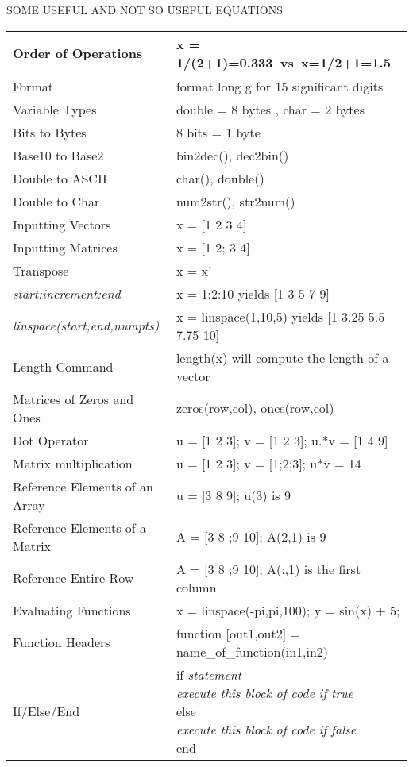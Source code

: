 \documentclass[11pt,a4paper,twoside,openright]{book}
\begin{document}
\begin{center}{\LARGE SOME USEFUL AND NOT SO USEFUL EQUATIONS}\end{center}

\begin{tabular}{|l | l|}
  \hline
  Order of Operations & x = 1/(2+1)=0.333~vs~x=1/2+1=1.5 \\
  \hline
  Format & format long g for 15 significant digits \\
  \hline
  Variable Types & double = 8 bytes , char = 2 bytes \\
  \hline
  Bits to Bytes & 8 bits = 1 byte \\
  \hline
  Base10 to Base2  & bin2dec(), dec2bin() \\
  \hline
  Double to ASCII  & char(), double() \\
  \hline
  Double to Char  & num2str(), str2num() \\
  \hline
  Inputting Vectors & x = [1 2 3 4] \\
  \hline
  Inputting Matrices & x = [1 2; 3 4] \\
  \hline
  Transpose & x = x' \\
  \hline
  {\it start:increment:end} & x = 1:2:10 yields
  [1 3 5 7 9] \\
  \hline
  {\it linspace(start,end,numpts)} & x =
  linspace(1,10,5) yields [1 3.25 5.5 7.75 10] \\
  \hline
  Length Command & length(x) will compute the length of a vector \\
  \hline
  Matrices of Zeros and Ones & zeros(row,col), ones(row,col)
  \\
  \hline
  Dot Operator & u = [1 2 3]; v = [1 2 3]; u.*v = [1 4 9] \\
  \hline
  Matrix multiplication & u = [1 2 3]; v = [1;2;3]; u*v = 14 \\
  \hline
  Reference Elements of an Array & u = [3 8 9]; u(3) is 9 \\
  \hline
  Reference Elements of a Matrix & A = [3 8 ;9 10]; A(2,1) is 9 \\
  \hline
  Reference Entire Row & A = [3 8 ;9 10]; A(:,1) is the first column
  \\
  \hline
  Evaluating Functions & x = linspace(-pi,pi,100); y = sin(x) + 5; \\
  \hline
  Function Headers & function [out1,out2] =
  name\_of\_function(in1,in2) \\
  \hline
  If/Else/End & \pbox{12cm}{if {\it statement} \\{\it execute this block of code if true}  \\  else \\ {\it execute this block of code if false}\\ end} \\

\end{tabular}
\end{document}
